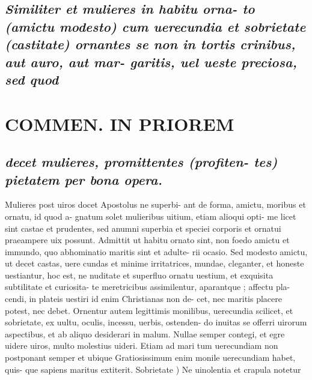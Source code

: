 \documentclass{article}
\begin{document}
\begin{pages}
\subsection*{\textit{Similiter et mulieres in habitu orna- to (amictu modesto) cum uerecundia et sobrietate (castitate) ornantes se non in tortis crinibus, aut auro, aut mar- garitis, uel ueste preciosa, sed quod }}
\section*{COMMEN. IN PRIOREM }
\marginpar{[ p.57 ]}
{}
\subsection*{\textit{decet mulieres, promittentes (profiten- tes) pietatem per bona opera. }}\pstart Mulieres post uiros docet Apostolus ne superbi- ant de forma, amictu, moribus et ornatu, id quod a- gnatum solet mulieribus uitium, etiam alioqui opti- me licet sint castae et prudentes, sed anumni superbia et speciei corporis et ornatui praeampere uix possunt. Admittit ut habitu ornato sint, non foedo amictu et immundo, quo abhominatio maritis sint et adulte- rii ocasio. Sed modesto amictu, ut decet castas, uere cundas et minime irritatrices, mundae, cleganter, et honeste uestiantur, hoc est, ne nuditate et superfluo ornatu uestium, et exquisita subtilitate et curiosita- te meretricibus assimilentur, aparantque ; affectu pla- cendi, in plateis uestiri id enim Christianas non de- cet, nec maritis placere potest, nec debet. Ornentur autem legittimis monilibus, uerecundia scilicet, et sobrietate, ex uultu, oculis, incessu, uerbis, ostenden- do inuitas se offerri uirorum aspectibus, et ab aliquo desiderari in malum. Nullae semper contegi, et egre uidere uiros, multo molestius uideri. Etiam ad mari tum uerecundiam non postponant semper et ubique  Gratiosissimum enim monile uerecundiam habet, quis- que sapiens maritus extiterit.  \pend\pstart Sobrietate ) Ne uinolentia et crapula notetur  \pend

\end{pages}
\end{document}
